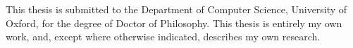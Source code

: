 This thesis is submitted to the Department of Computer Science,
University of Oxford, for the degree of Doctor of Philosophy. This
thesis is entirely my own work, and, except where otherwise indicated,
describes my own research.
